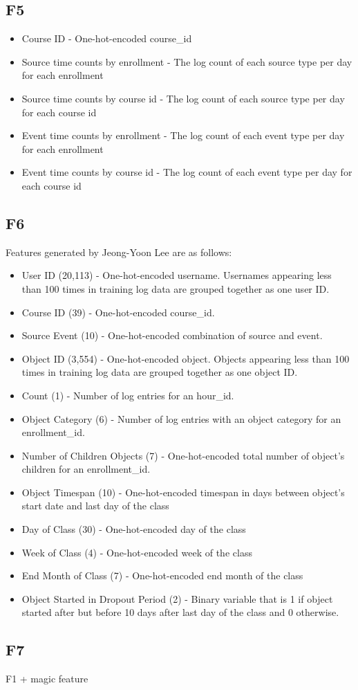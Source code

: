 \subsection{F5}
\begin{itemize}
  \setlength\itemsep{0em}
  \item Course ID - One-hot-encoded course\_id
  \item Source time counts  by enrollment - The log count of each source type per day for each enrollment
  \item Source time counts by course id - The log count of each source type per day for each course id
  \item Event time counts by enrollment - The log count of each event type per day for each enrollment
  \item Event time counts by course id - The log count of each event type per day for each course id

\end{itemize}

\subsection{F6}
Features generated by Jeong-Yoon Lee are as follows:

\begin{itemize}
  \setlength\itemsep{0em}
  \item User ID (20,113) - One-hot-encoded username. Usernames appearing less than 100 times in training log data are grouped together as one user ID. 
  \item Course ID (39) - One-hot-encoded course\_id.
  \item Source Event (10) - One-hot-encoded combination of source and event.
  \item Object ID (3,554) - One-hot-encoded object.  Objects appearing less than 100 times in training log data are grouped together as one object ID.
  \item Count (1) - Number of log entries for an hour\_id.
  \item Object Category (6) - Number of log entries with an object category for an enrollment\_id.
  \item Number of Children Objects (7) - One-hot-encoded total number of object's children for an enrollment\_id.
  \item Object Timespan (10) - One-hot-encoded timespan in days between object's start date and last day of the class
  \item Day of Class (30) - One-hot-encoded day of the class
  \item Week of Class (4) - One-hot-encoded week of the class
  \item End Month of Class (7) - One-hot-encoded end month of the class
  \item Object Started in Dropout Period (2) - Binary variable that is 1 if object started after but before 10 days after last day of the class and 0 otherwise.
\end{itemize}

\subsection{F7}
F1 + magic feature
